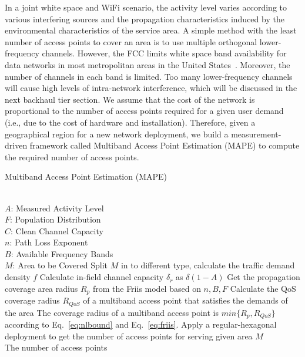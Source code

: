 In a joint white space and WiFi scenario, the activity level varies according to various interfering sources 
and the propagation characteristics induced by the environmental characteristics of the service area. A 
simple method with the least number of access points to cover an area is to use multiple orthogonal 
lower-frequency channels. However, the FCC limits white space band availability for data networks in most 
metropolitan areas in the United States~\cite{googledatabase}. Moreover, the number of channels in each band 
is limited. Too many lower-frequency channels will cause high levels of intra-network interference, 
which will be discussed in the next backhaul tier section. We assume that the cost of the network is proportional to the 
number of access points required for a given user demand (i.e., due to the cost of hardware and installation). 
Therefore, given a geographical region for a new network deployment, we build a measurement-driven framework 
called Multiband Access Point Estimation (MAPE) to compute the required number of access points.


\begin{algorithm}[t]
\small
\caption{Multiband Access Point Estimation (MAPE)}
\label{algorithm:mape}
\begin{algorithmic}[1]
\REQUIRE  ~~\\
$A$: Measured Activity Level \\
$F$: Population Distribution\\
$C$: Clean Channel Capacity\\
$n$: Path Loss Exponent \\
$B$: Available Frequency Bands\\
$M$: Area to be Covered
\STATE Split $M$ in to different type, calculate the traffic demand density $f$
\STATE Calculate in-field channel capacity $\delta_r$ as $\delta(1-A)$
\STATE Get the propagation coverage area radius $R_p$ from the Friis model based on $n,B,F$
\STATE Calculate the QoS coverage radius $R_{QoS}$ of a multiband access point that satisfies the demands of the area
\STATE The coverage radius of a multiband access point is $min\{R_p,R_{QoS}\}$ according to Eq.~\ref{eq:nlbound} and Eq.~\ref{eq:friis}.
\STATE Apply a regular-hexagonal deployment to get the number of access points for serving given area $M$
\ENSURE ~~\\
The number of access points\\
\end{algorithmic}
\end{algorithm}

